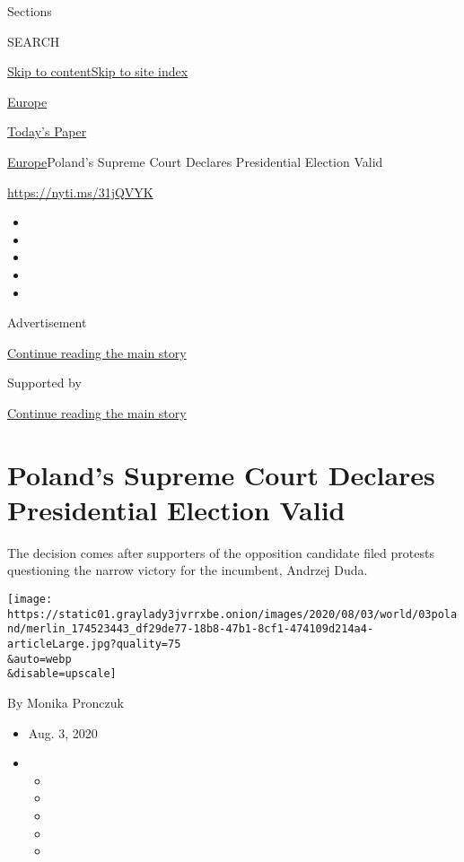 Sections

SEARCH

\protect\hyperlink{site-content}{Skip to
content}\protect\hyperlink{site-index}{Skip to site index}

\href{https://www.nytimes3xbfgragh.onion/section/world/europe}{Europe}

\href{https://myaccount.nytimes3xbfgragh.onion/auth/login?response_type=cookie\&client_id=vi}{}

\href{https://www.nytimes3xbfgragh.onion/section/todayspaper}{Today's
Paper}

\href{/section/world/europe}{Europe}\textbar{}Poland's Supreme Court
Declares Presidential Election Valid

\url{https://nyti.ms/31jQVYK}

\begin{itemize}
\item
\item
\item
\item
\item
\end{itemize}

Advertisement

\protect\hyperlink{after-top}{Continue reading the main story}

Supported by

\protect\hyperlink{after-sponsor}{Continue reading the main story}

\hypertarget{polands-supreme-court-declares-presidential-election-valid}{%
\section{Poland's Supreme Court Declares Presidential Election
Valid}\label{polands-supreme-court-declares-presidential-election-valid}}

The decision comes after supporters of the opposition candidate filed
protests questioning the narrow victory for the incumbent, Andrzej Duda.

\texttt{[image: https://static01.graylady3jvrrxbe.onion/images/2020/08/03/world/03poland/merlin\_174523443\_df29de77-18b8-47b1-8cf1-474109d214a4-articleLarge.jpg?quality=75\\\&auto=webp\\\&disable=upscale]}

By Monika Pronczuk

\begin{itemize}
\item
  Aug. 3, 2020
\item
  \begin{itemize}
  \item
  \item
  \item
  \item
  \item
  \end{itemize}
\end{itemize}

